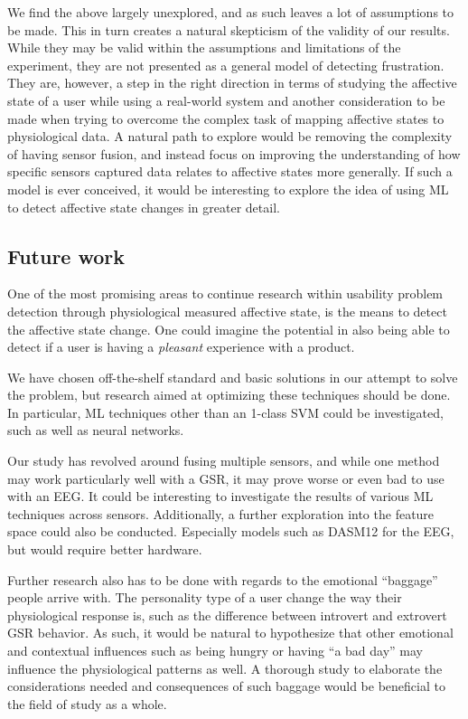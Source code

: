 We find the above largely unexplored, and as such leaves a lot of assumptions to be made.
This in turn creates a natural skepticism of the validity of our results.
While they may be valid within the assumptions and limitations of the experiment, they are not presented as a general model of detecting frustration. 
They are, however, a step in the right direction in terms of studying the affective state of a user while using a real-world system and another consideration to be made when trying to overcome the complex task of mapping affective states to physiological data. 
A natural path to explore would be removing the complexity of having sensor fusion, and instead focus on improving the understanding of how specific sensors captured data relates to affective states more generally. 
If such a model is ever conceived, it would be interesting to explore the idea of using ML to detect affective state
changes in greater detail.

\subsection{Future work}
One of the most promising areas to continue research within usability problem detection through physiological measured
affective state, is the means to detect the affective state change. One could imagine the potential in also being able
to detect if a user is having a \textit{pleasant} experience with a product.

We have chosen off-the-shelf standard and basic solutions in our attempt to solve the problem, but research aimed at optimizing these techniques should be done. 
In particular, ML techniques other than an 1-class SVM could be investigated, such as well as neural networks.

Our study has revolved around fusing multiple sensors, and while one method may work particularly well with a GSR, it may prove worse or even bad to use with an EEG. 
It could be interesting to investigate the results of various ML techniques across sensors.
Additionally, a further exploration into the feature space could also be conducted. 
Especially models such as DASM12\cite{eeg_music_listening} for the EEG, but would require better hardware.

Further research also has to be done with regards to the emotional ``baggage'' people arrive with. 
The personality type of a user change the way their physiological response is, such as the difference between introvert and extrovert GSR behavior. 
As such, it would be natural to hypothesize that other emotional and contextual influences such as being hungry or having ``a bad day'' may influence the physiological patterns as well. 
A thorough study to elaborate the considerations needed and consequences of such baggage would be beneficial to the field of study as a whole. 